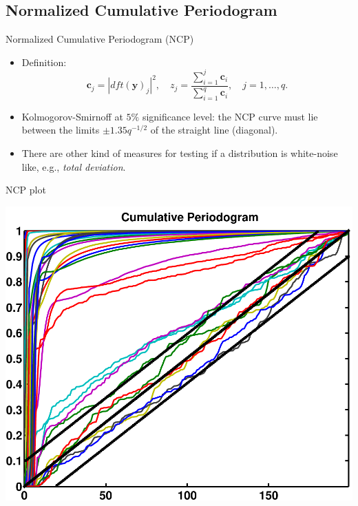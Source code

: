 \documentclass{beamer}
\begin{document}
\subsection{Normalized Cumulative Periodogram}
\begin{frame}{Normalized Cumulative Periodogram (NCP)}
  \begin{itemize}
    \item Definition:
      \begin{equation*}
	\mathbf{c}_{j} = |dft(\mathbf{y})_{j}|^{2}, \quad z_{j} =
	\frac{\sum_{i=1}^{j}\mathbf{c}_{i}}{\sum_{i=1}^{q}\mathbf{c}_{i}},
	\quad j = 1,\ldots,q.
      \end{equation*}

    \item Kolmogorov-Smirnoff at $5\%$ significance level: the NCP curve must
      lie between the limits $\pm 1.35q^{-1/2}$ of the straight line (diagonal).

    \item There are other kind of measures for testing if a distribution is
      white-noise like, e.g., \emph{total deviation}.
    \end{itemize}
\end{frame}

\begin{frame}{NCP plot}
  \begin{center}
    \includegraphics[width=0.55\linewidth]{figures/run1/cum_per}
  \end{center}
\end{frame}
\end{document}
